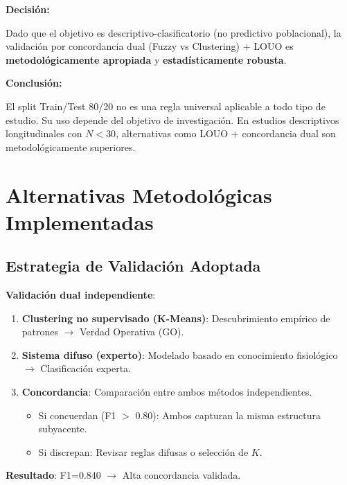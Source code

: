 \documentclass[12pt,letterpaper,twoside]{report}
\begin{document}
\begin{decisionbox}
\textbf{Decisión:}

Dado que el objetivo es descriptivo-clasificatorio (no predictivo poblacional), la validación por concordancia dual (Fuzzy vs Clustering) + LOUO es \textbf{metodológicamente apropiada} y \textbf{estadísticamente robusta}.
\end{decisionbox}

\begin{conclusionbox}
\textbf{Conclusión:}

El split Train/Test 80/20 no es una regla universal aplicable a todo tipo de estudio. Su uso depende del objetivo de investigación. En estudios descriptivos longitudinales con $N < 30$, alternativas como LOUO + concordancia dual son metodológicamente superiores.
\end{conclusionbox}

\section{Alternativas Metodológicas Implementadas}

\subsection{Estrategia de Validación Adoptada}

\begin{decisionbox}
\textbf{Validación dual independiente}:

\begin{enumerate}[noitemsep]
    \item \textbf{Clustering no supervisado (K-Means)}: Descubrimiento empírico de patrones $\to$ Verdad Operativa (GO).
    
    \item \textbf{Sistema difuso (experto)}: Modelado basado en conocimiento fisiológico $\to$ Clasificación experta.
    
    \item \textbf{Concordancia}: Comparación entre ambos métodos independientes.
    \begin{itemize}[noitemsep]
        \item Si concuerdan (F1 $>$ 0.80): Ambos capturan la misma estructura subyacente.
        \item Si discrepan: Revisar reglas difusas o selección de $K$.
    \end{itemize}
\end{enumerate}

\textbf{Resultado}: F1=0.840 $\to$ Alta concordancia validada.
\end{decisionbox}
\end{document}
